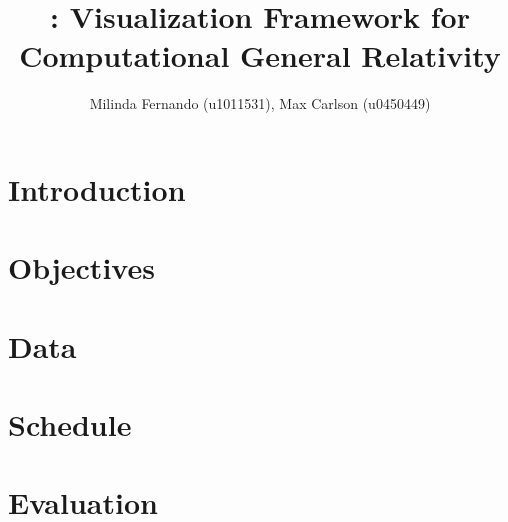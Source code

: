\documentclass[a4paper,10pt]{article}
\title{\grvis : Visualization Framework for Computational General Relativity}
\author{Milinda Fernando (u1011531), Max Carlson (u0450449)}
\begin{document}
\maketitle

\section{Introduction}


\section{Objectives}

\section{Data}

\section{Schedule}

\section{Evaluation}


\end{document}

